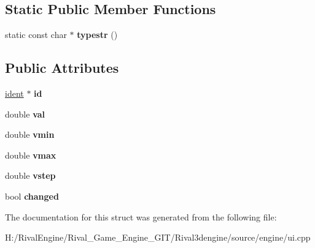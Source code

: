 \subsection*{Static Public Member Functions}
\begin{DoxyCompactItemize}
\item 
\mbox{\label{struct_u_i_1_1_slider_abf00780d2040f72eaf665dc4eef8e593}} 
static const char $\ast$ {\bfseries typestr} ()
\end{DoxyCompactItemize}
\subsection*{Public Attributes}
\begin{DoxyCompactItemize}
\item 
\mbox{\label{struct_u_i_1_1_slider_a486ca1a28e590707c311e7c76eacb7e9}} 
\hyperlink{structident}{ident} $\ast$ {\bfseries id}
\item 
\mbox{\label{struct_u_i_1_1_slider_a31b03094ed3858e63fb073fd252b4d65}} 
double {\bfseries val}
\item 
\mbox{\label{struct_u_i_1_1_slider_a69ce0f12e8b6834b4305cd029528e470}} 
double {\bfseries vmin}
\item 
\mbox{\label{struct_u_i_1_1_slider_a28e11f79c690a4a79d525912cf03eeed}} 
double {\bfseries vmax}
\item 
\mbox{\label{struct_u_i_1_1_slider_af9cf5e9fd60bd8ce5ce56708ccfd79be}} 
double {\bfseries vstep}
\item 
\mbox{\label{struct_u_i_1_1_slider_a9fba0faed66ef74fcbd5264fda789a03}} 
bool {\bfseries changed}
\end{DoxyCompactItemize}


The documentation for this struct was generated from the following file\+:\begin{DoxyCompactItemize}
\item 
H\+:/\+Rival\+Engine/\+Rival\+\_\+\+Game\+\_\+\+Engine\+\_\+\+G\+I\+T/\+Rival3dengine/source/engine/ui.\+cpp\end{DoxyCompactItemize}
